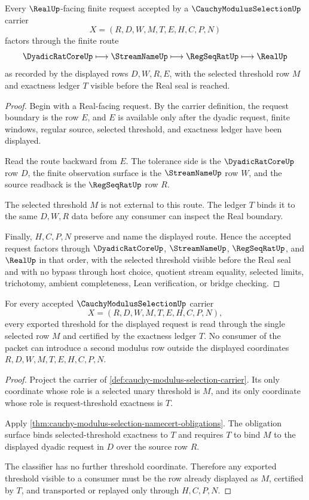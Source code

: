 \begin{theorem}
\label{thm:cauchy-modulus-selection-real-request-handoff}
Every $\RealUp$-facing finite request accepted by a $\CauchyModulusSelectionUp$ carrier
$$
X=(R,D,W,M,T,E,H,C,P,N)
$$
factors through the finite route
$$
\DyadicRatCoreUp \longmapsto \StreamNameUp \longmapsto \RegSeqRatUp \longmapsto \RealUp
$$
as recorded by the displayed rows $D,W,R,E$, with the selected threshold row $M$ and exactness ledger $T$ visible before the Real seal is reached.
\end{theorem}
\begin{proof}
Begin with a Real-facing request. By the carrier definition, the request boundary is the row $E$, and $E$ is available only after the dyadic request, finite windows, regular source, selected threshold, and exactness ledger have been displayed.

Read the route backward from $E$. The tolerance side is the $\DyadicRatCoreUp$ row $D$, the finite observation surface is the $\StreamNameUp$ row $W$, and the source readback is the $\RegSeqRatUp$ row $R$.

The selected threshold $M$ is not external to this route. The ledger $T$ binds it to the same $D,W,R$ data before any consumer can inspect the Real boundary.

Finally, $H,C,P,N$ preserve and name the displayed route. Hence the accepted request factors through $\DyadicRatCoreUp$, $\StreamNameUp$, $\RegSeqRatUp$, and $\RealUp$ in that order, with the selected threshold visible before the Real seal and with no bypass through host choice, quotient stream equality, selected limits, trichotomy, ambient completeness, Lean verification, or bridge checking.
\end{proof}

\begin{theorem}
\label{thm:cauchy-modulus-selection-threshold-uniqueness}
For every accepted $\CauchyModulusSelectionUp$ carrier
$$
X=(R,D,W,M,T,E,H,C,P,N),
$$
every exported threshold for the displayed request is read through the single selected row $M$ and certified by the exactness ledger $T$. No consumer of the packet can introduce a second modulus row outside the displayed coordinates $R,D,W,M,T,E,H,C,P,N$.
\end{theorem}
\begin{proof}
Project the carrier of \autoref{def:cauchy-modulus-selection-carrier}. Its only coordinate whose role is a selected unary threshold is $M$, and its only coordinate whose role is request-threshold exactness is $T$.

Apply \autoref{thm:cauchy-modulus-selection-namecert-obligations}. The obligation surface binds selected-threshold exactness to $T$ and requires $T$ to bind $M$ to the displayed dyadic request in $D$ over the source row $R$.

The classifier has no further threshold coordinate. Therefore any exported threshold visible to a consumer must be the row already displayed as $M$, certified by $T$, and transported or replayed only through $H,C,P,N$.
\end{proof}

